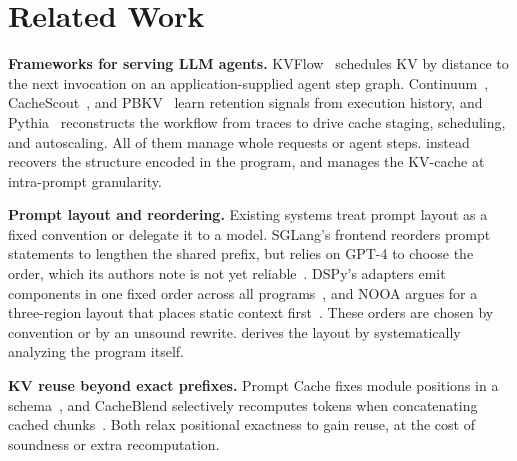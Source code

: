 \section{Related Work}
\label{sec:related_works}

\textbf{Frameworks for serving LLM agents.} KVFlow~\cite{pan2025kvflow} schedules KV by distance to the next invocation on an application-supplied agent step graph. Continuum~\cite{li2025continuum}, CacheScout~\cite{zhang2026cachescout}, and PBKV~\cite{zheng2026pbkv} learn retention signals from execution history, and Pythia~\cite{yu2026pythia} reconstructs the workflow from traces to drive cache staging, scheduling, and autoscaling. All of them manage whole requests or agent steps. \sysname instead recovers the structure encoded in the program, and manages the KV-cache at intra-prompt granularity.

\textbf{Prompt layout and reordering.} Existing systems treat prompt layout as a fixed convention or delegate it to a model. SGLang's frontend reorders prompt statements to lengthen the shared prefix, but relies on GPT-4 to choose the order, which its authors note is not yet reliable~\cite{zheng2024sglang}.
DSPy's adapters emit components in one fixed order across all programs~\cite{dspy2026chatadapter}, and NOOA argues for a three-region layout that places static context first~\cite{furgale2026nooa}. These orders are chosen by convention or by an unsound rewrite. \sysname derives the layout by systematically analyzing the program itself.

\textbf{KV reuse beyond exact prefixes.} Prompt Cache fixes module positions in a schema~\cite{gim2024promptcache}, and CacheBlend selectively recomputes tokens when concatenating cached chunks~\cite{yao2025cacheblend}. Both relax positional exactness to gain reuse, at the cost of soundness or extra recomputation. 
